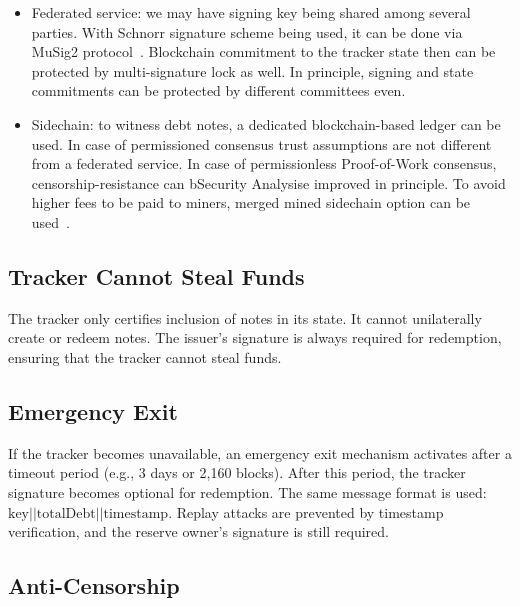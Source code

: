 \documentclass{ifcolog}
\begin{document}
\begin{itemize}
    \item{Federated service}: we may have signing key being shared among several parties. With Schnorr signature scheme being
    used, it can be done via MuSig2 protocol~\cite{nick2021musig2}. Blockchain commitment to the tracker state then can be protected
    by multi-signature lock as well. In principle, signing and state commitments can be protected by different committees even.
    \item{Sidechain}: to witness debt notes, a dedicated blockchain-based ledger can be used. In case of permissioned consensus
     trust assumptions are not different from a federated service. In case of permissionless Proof-of-Work consensus,
     censorship-resistance can bSecurity Analysise improved in principle. To avoid higher fees to be paid to miners, merged mined sidechain
     option can be used~\cite{ergosidechain}.
\end{itemize}

\subsection{Tracker Cannot Steal Funds}

The tracker only certifies inclusion of notes in its state. It cannot unilaterally create or redeem notes. The issuer's signature is always required for redemption, ensuring that the tracker cannot steal funds.

\subsection{Emergency Exit}

If the tracker becomes unavailable, an emergency exit mechanism activates after a timeout period (e.g., 3 days or 2,160 blocks). After this period, the tracker signature becomes optional for redemption. The same message format is used: $\text{key} || \text{totalDebt} || \text{timestamp}$. Replay attacks are prevented by timestamp verification, and the reserve owner's signature is still required.

\subsection{Anti-Censorship}
\end{document}
